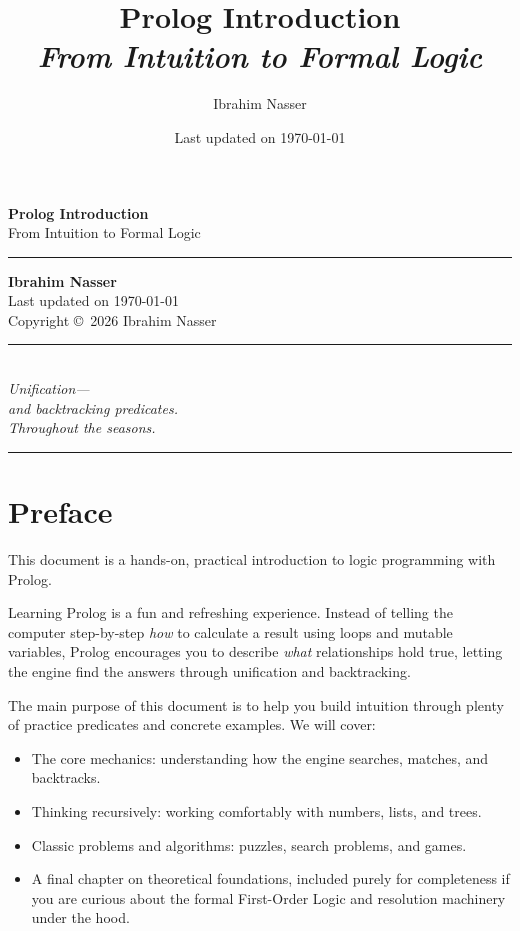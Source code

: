\documentclass[10pt]{article}
\title{
    \textbf{\LARGE Prolog Introduction} \\[0.5em]
    \large \textit{From Intuition to Formal Logic}
    }
\author{Ibrahim Nasser}
\date{\small Last updated on \today}
\begin{document}
\begin{titlepage}
    \thispagestyle{empty}
    \vspace*{4cm}
    
    \raggedright
    {\fontsize{34}{40}\selectfont \textbf{Prolog Introduction}}\\[0.6em]
    {\LARGE \textcolor{gray!70}{From Intuition to Formal Logic}}\\[2em]
    
    {\color{teal!80!black}\rule{80pt}{3pt}}
    
    \vfill
    
    {\large \textbf{Ibrahim Nasser}}\\[0.4em]
    {\small Last updated on \today}\\[0.8em]
    {\footnotesize\textcolor{gray!70}{Copyright \copyright\ 2026 Ibrahim Nasser}}
    \vspace*{2cm}
\end{titlepage}
\clearpage
\thispagestyle{empty}
\vspace*{0.33\textheight}
\begin{center}
    {\color{black!75}\rule{100pt}{0.8pt}}\\[2.2em]
    {\Large\itshape
    Unification---\\[0.5em]
    and backtracking predicates.\\[0.5em]
    Throughout the seasons.}
    \\[2.2em]
    {\color{black!75}\rule{100pt}{0.8pt}}
\end{center}
\vfill
\clearpage

\section*{Preface}

This document is a hands-on, practical introduction to logic programming with Prolog.

Learning Prolog is a fun and refreshing experience. Instead of telling the computer step-by-step \textit{how} to calculate a result using loops and mutable variables, Prolog encourages you to describe \textit{what} relationships hold true, letting the engine find the answers through unification and backtracking.

The main purpose of this document is to help you build intuition through plenty of practice predicates and concrete examples. We will cover:
\begin{itemize}
    \item The core mechanics: understanding how the engine searches, matches, and backtracks.
    \item Thinking recursively: working comfortably with numbers, lists, and trees.
    \item Classic problems and algorithms: puzzles, search problems, and games.
    \item A final chapter on theoretical foundations, included purely for completeness if you are curious about the formal First-Order Logic and resolution machinery under the hood.
\end{itemize}
\end{document}
